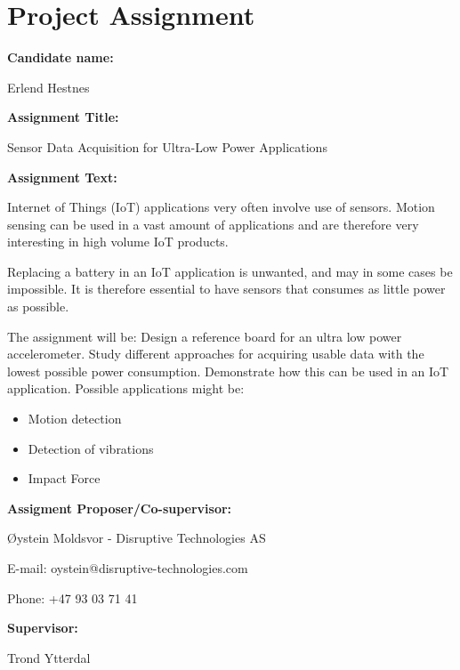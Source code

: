 \section*{Project Assignment}

\textbf{Candidate name:} 

Erlend Hestnes

\textbf{Assignment Title:} 

Sensor Data Acquisition for Ultra-Low Power Applications

\textbf{Assignment Text:}
 
Internet of Things (IoT) applications very often involve use of sensors. Motion sensing can be used in a vast amount of applications and are therefore very interesting in high volume IoT products.
 
Replacing a battery in an IoT application is unwanted, and may in some cases be impossible. It is therefore essential to have sensors that consumes as little power as possible.

The assignment will be:
Design a reference board for an ultra low power accelerometer. Study different approaches for acquiring usable data with the lowest possible power consumption. Demonstrate how this can be used in an IoT application. Possible applications might be:
\begin{itemize}
\item Motion detection
\item Detection of vibrations
\item Impact Force
\end{itemize}

\textbf{Assigment Proposer/Co-supervisor:} 

Øystein Moldsvor - Disruptive Technologies AS

E-mail: oystein@disruptive-technologies.com

Phone: +47 93 03 71 41

\textbf{Supervisor:} 

Trond Ytterdal


